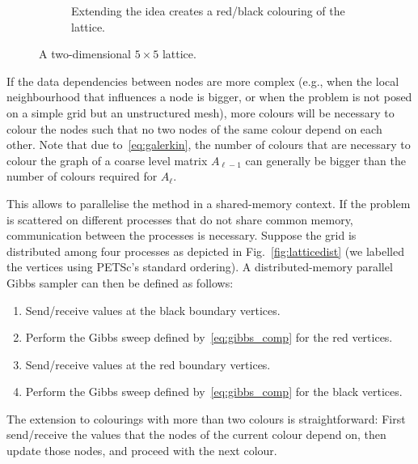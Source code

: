 \documentclass[
fontsize=11pt,
paper=a4,
numbers=noenddot
]{scrartcl}
\begin{document}
\begin{figure}[htbp]
\begin{subfigure}[t]{.48\linewidth}
        \caption{Extending the idea creates a red/black colouring of the lattice.}\label{fig:lattice2}
    \end{subfigure}
    \caption{A two-dimensional $5 \times 5$ lattice.}\label{fig:lattice}
  \end{figure}

If the data dependencies between nodes are more complex (e.g., when the local neighbourhood that influences a node is bigger, or when the problem is not posed on a simple grid but an unstructured mesh), more colours will be necessary to colour the nodes such that no two nodes of the same colour depend on each other. Note that due to~\eqref{eq:galerkin}, the number of colours that are necessary to colour the graph of a coarse level matrix $A_{\ell-1}$ can generally be bigger than the number of colours required for $A_{\ell}$.

This allows to parallelise the method in a shared-memory context. If the problem is scattered on different processes that do not share common memory, communication between the processes is necessary. Suppose the grid is distributed among four processes as depicted in Fig.~\ref{fig:latticedist} (we labelled the vertices using PETSc's standard ordering). A distributed-memory parallel Gibbs sampler can then be defined as follows:
\begin{enumerate}
    \item Send/receive values at the black boundary vertices.
    \item Perform the Gibbs sweep defined by~\eqref{eq:gibbs_comp} for the red vertices.
    \item Send/receive values at the red boundary vertices.
    \item Perform the Gibbs sweep defined by~\eqref{eq:gibbs_comp} for the black vertices.
\end{enumerate}
The extension to colourings with more than two colours is straightforward: First send/receive the values that the nodes of the current colour depend on, then update those nodes, and proceed with the next colour.
\end{document}
